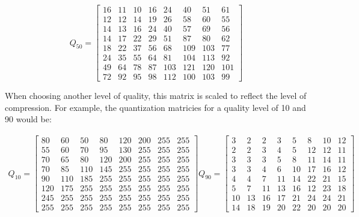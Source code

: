 \documentclass[11pt]{article}
\begin{document}
\begin{equation}
  \label{eqn:quantization50}
  Q_{50} = \begin{bmatrix}
    16 & 11 & 10 & 16 & 24 & 40 & 51 & 61 \\
    12 & 12 & 14 & 19 & 26 & 58 & 60 & 55 \\
    14 & 13 & 16 & 24 & 40 & 57 & 69 & 56 \\
    14 & 17 & 22 & 29 & 51 & 87 & 80 & 62 \\
    18 & 22 & 37 & 56 & 68 & 109 & 103 & 77 \\
    24 & 35 & 55 & 64 & 81 & 104 & 113 & 92 \\
    49 & 64 & 78 & 87 & 103 & 121 & 120 & 101 \\
    72 & 92 & 95 & 98 & 112 & 100 & 103 & 99
  \end{bmatrix}
\end{equation}

When choosing another level of quality, this matrix is scaled to reflect the level of compression.
For example, the quantization matricies for a quality level of 10 and 90 would be:

\begin{align*}
  Q_{10} = \begin{bmatrix}
    80 & 60 & 50 & 80 & 120 & 200 & 255 & 255 \\
    55 & 60 & 70 & 95 & 130 & 255 & 255 & 255 \\
    70 & 65 & 80 & 120 & 200 & 255 & 255 & 255 \\
    70 & 85 & 110 & 145 & 255 & 255 & 255 & 255 \\
    90 & 110 & 185 & 255 & 255 & 255 & 255 & 255 \\
    120 & 175 & 255 & 255 & 255 & 255 & 255 & 255 \\
    245 & 255 & 255 & 255 & 255 & 255 & 255 & 255 \\
    255 & 255 & 255 & 255 & 255 & 255 & 255 & 255
  \end{bmatrix}
  Q_{90} = \begin{bmatrix}
    3 & 2 & 2 & 3 & 5 & 8 & 10 & 12 \\
    2 & 2 & 3 & 4 & 5 & 12 & 12 & 11 \\
    3 & 3 & 3 & 5 & 8 & 11 & 14 & 11 \\
    3 & 3 & 4 & 6 & 10 & 17 & 16 & 12 \\
    4 & 4 & 7 & 11 & 14 & 22 & 21 & 15 \\
    5 & 7 & 11 & 13 & 16 & 12 & 23 & 18 \\
    10 & 13 & 16 & 17 & 21 & 24 & 24 & 21 \\
    14 & 18 & 19 & 20 & 22 & 20 & 20 & 20 
  \end{bmatrix}
\end{align*}
\end{document}
